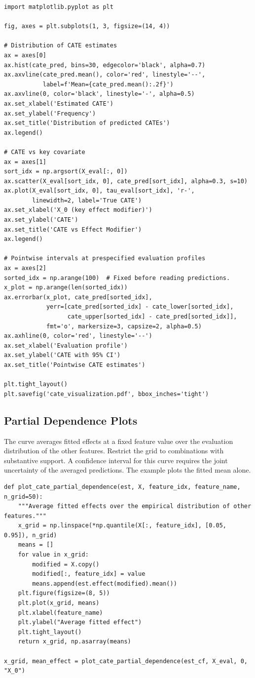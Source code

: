 \begin{verbatim}
import matplotlib.pyplot as plt

fig, axes = plt.subplots(1, 3, figsize=(14, 4))

# Distribution of CATE estimates
ax = axes[0]
ax.hist(cate_pred, bins=30, edgecolor='black', alpha=0.7)
ax.axvline(cate_pred.mean(), color='red', linestyle='--',
           label=f'Mean={cate_pred.mean():.2f}')
ax.axvline(0, color='black', linestyle='-', alpha=0.5)
ax.set_xlabel('Estimated CATE')
ax.set_ylabel('Frequency')
ax.set_title('Distribution of predicted CATEs')
ax.legend()

# CATE vs key covariate
ax = axes[1]
sort_idx = np.argsort(X_eval[:, 0])
ax.scatter(X_eval[sort_idx, 0], cate_pred[sort_idx], alpha=0.3, s=10)
ax.plot(X_eval[sort_idx, 0], tau_eval[sort_idx], 'r-',
        linewidth=2, label='True CATE')
ax.set_xlabel('X_0 (key effect modifier)')
ax.set_ylabel('CATE')
ax.set_title('CATE vs Effect Modifier')
ax.legend()

# Pointwise intervals at prespecified evaluation profiles
ax = axes[2]
sorted_idx = np.arange(100)  # Fixed before reading predictions.
x_plot = np.arange(len(sorted_idx))
ax.errorbar(x_plot, cate_pred[sorted_idx],
            yerr=[cate_pred[sorted_idx] - cate_lower[sorted_idx],
                  cate_upper[sorted_idx] - cate_pred[sorted_idx]],
            fmt='o', markersize=3, capsize=2, alpha=0.5)
ax.axhline(0, color='red', linestyle='--')
ax.set_xlabel('Evaluation profile')
ax.set_ylabel('CATE with 95% CI')
ax.set_title('Pointwise CATE estimates')

plt.tight_layout()
plt.savefig('cate_visualization.pdf', bbox_inches='tight')
\end{verbatim}

\subsection{Partial Dependence Plots}

The curve averages fitted effects at a fixed feature value over the evaluation distribution of the other features. Restrict the grid to combinations with substantive support. A confidence interval for this curve requires the joint uncertainty of the averaged predictions. The example plots the fitted mean alone.

\begin{verbatim}
def plot_cate_partial_dependence(est, X, feature_idx, feature_name, n_grid=50):
    """Average fitted effects over the empirical distribution of other features."""
    x_grid = np.linspace(*np.quantile(X[:, feature_idx], [0.05, 0.95]), n_grid)
    means = []
    for value in x_grid:
        modified = X.copy()
        modified[:, feature_idx] = value
        means.append(est.effect(modified).mean())
    plt.figure(figsize=(8, 5))
    plt.plot(x_grid, means)
    plt.xlabel(feature_name)
    plt.ylabel("Average fitted effect")
    plt.tight_layout()
    return x_grid, np.asarray(means)

x_grid, mean_effect = plot_cate_partial_dependence(est_cf, X_eval, 0, "X_0")
\end{verbatim}


